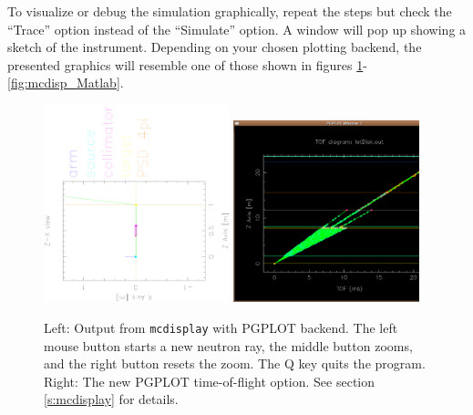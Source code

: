   
To visualize or debug the simulation graphically, repeat the
steps but check the ``Trace'' option instead of the ``Simulate'' option.
A window will pop up showing a sketch of the instrument.
Depending on your
chosen plotting backend, the presented graphics will resemble one of
those shown in figures \ref{fig:mcdisp_PGPLOT}-\ref{fig:mcdisp_Matlab}.
\begin{figure}[htb!]
  \begin{center}
    \includegraphics[width=0.48\textwidth]{figures/mcdisplay_PGPLOT.ps}
    \includegraphics[width=0.48\textwidth]{figures/mcdisplay_TOF.ps}
  \end{center}
\caption{Left: Output from \texttt{mcdisplay} with PGPLOT backend.
  The left mouse button starts a new neutron ray, the middle button zooms, and
  the right button resets the zoom. The Q key quits the
  program. Right: The new PGPLOT time-of-flight option. See section \ref{s:mcdisplay} for details.}
\label{fig:mcdisp_PGPLOT}
\end{figure}
